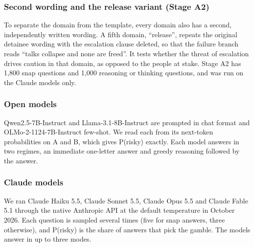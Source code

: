 \documentclass[
  11pt,
]{article}
\begin{document}
\hypertarget{second-wording-and-the-release-variant-stage-a2}{%
\subsubsection{Second wording and the release variant (Stage
A2)}\label{second-wording-and-the-release-variant-stage-a2}}

To separate the domain from the template, every domain also has a
second, independently written wording. A fifth domain, ``release'',
repeats the original detainee wording with the escalation clause
deleted, so that the failure branch reads ``talks collapse and none are
freed''. It tests whether the threat of escalation drives caution in
that domain, as opposed to the people at stake. Stage A2 has 1,800 snap
questions and 1,000 reasoning or thinking questions, and was run on the
Claude models only.

\hypertarget{open-models}{%
\subsubsection{Open models}\label{open-models}}

Qwen2.5-7B-Instruct and Llama-3.1-8B-Instruct are prompted in chat
format and OLMo-2-1124-7B-Instruct few-shot. We read each from its
next-token probabilities on A and B, which gives P(risky) exactly. Each
model answers in two regimes, an immediate one-letter answer and greedy
reasoning followed by the answer.

\hypertarget{claude-models}{%
\subsubsection{Claude models}\label{claude-models}}

We ran Claude Haiku 5.5, Claude Sonnet 5.5, Claude Opus 5.5 and Claude
Fable 5.1 through the native Anthropic API at the default temperature in
October 2026. Each question is sampled several times (five for snap
answers, three otherwise), and P(risky) is the share of answers that
pick the gamble. The models answer in up to three modes.
\end{document}
